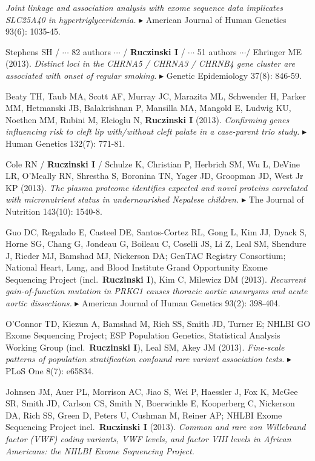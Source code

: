 \documentclass[10pt]{article}
\newcommand{\mine}{
  \addtocounter{enumi}{1}
\item[\fcolorbox{white}{grey}{\color{white} \tiny \arabic{enumi}}]
}
\newcommand{\dg}[1]{{\color{black} $\blacktriangleright$ {#1}}}
\begin{document}
{\it Joint linkage and association analysis with exome sequence data implicates SLC25A40 in hypertriglyceridemia.}
\dg{American Journal of Human Genetics 93(6): 1035-45.} 
\item
Stephens SH / $\cdots$ 82 authors $\cdots$ / {\bf Ruczinski I} / $\cdots$ 51 authors $\cdots/$ Ehringer ME (2013).
{\it Distinct loci in the CHRNA5 / CHRNA3 / CHRNB4 gene cluster are associated with onset of regular smoking.}
\dg{Genetic Epidemiology 37(8): 846-59.} 
\mine 
Beaty TH, Taub MA, Scott AF, Murray JC, Marazita ML, Schwender H, Parker MM, Hetmanski JB, Balakrishnan P, Mansilla MA, Mangold E, Ludwig KU, Noethen MM, Rubini M, Elcioglu N, {\bf Ruczinski I} (2013).
{\it Confirming genes influencing risk to cleft lip with/without cleft palate in a case-parent trio study.}
\dg{Human Genetics 132(7): 771-81.} 
\mine 
Cole RN / {\bf Ruczinski I} / Schulze K, Christian P, Herbrich SM, Wu L, DeVine LR, O'Meally RN, Shrestha S, Boronina TN, Yager JD, Groopman JD, West Jr KP (2013).
{\it The plasma proteome identifies expected and novel proteins correlated with micronutrient status in undernourished Nepalese children.}
\dg{The Journal of Nutrition 143(10): 1540-8.}
\item
Guo DC, Regalado E, Casteel DE, Santos-Cortez RL, Gong L, Kim JJ, Dyack S, Horne SG, Chang G, Jondeau G, Boileau C, Coselli JS, Li Z, Leal SM, Shendure J, Rieder MJ, Bamshad MJ, Nickerson DA; GenTAC Registry Consortium; National Heart, Lung, and Blood Institute Grand Opportunity Exome Sequencing Project (incl.~{\bf Ruczinski I}), Kim C, Milewicz DM (2013).
{\it Recurrent gain-of-function mutation in PRKG1 causes thoracic aortic aneurysms and acute aortic dissections.}
\dg{American Journal of Human Genetics 93(2): 398-404.}
\item
O'Connor TD, Kiezun A, Bamshad M, Rich SS, Smith JD, Turner E; NHLBI GO Exome Sequencing Project; ESP Population Genetics, Statistical Analysis Working Group (incl.~{\bf Ruczinski I}), Leal SM, Akey JM (2013).
{\it Fine-scale patterns of population stratification confound rare variant association tests.}
\dg{PLoS One 8(7): e65834.} 
\item
Johnsen JM, Auer PL, Morrison AC, Jiao S, Wei P, Haessler J, Fox K, McGee SR, Smith JD, Carlson CS, Smith N, Boerwinkle E, Kooperberg C, Nickerson DA, Rich SS, Green D, Peters U, Cushman M, Reiner AP; NHLBI Exome Sequencing Project incl.~{\bf Ruczinski I} (2013).
{\it Common and rare von Willebrand factor (VWF) coding variants, VWF levels, and factor VIII levels in African Americans: the NHLBI Exome Sequencing Project.}
\end{document}
